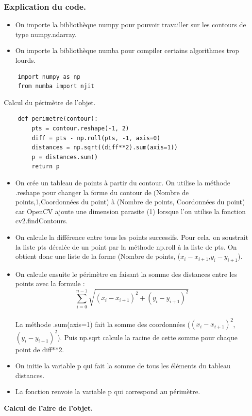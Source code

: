 \documentclass[titlepage]{article}
\begin{document}
	\subsubsection{Explication du code.}
	\begin{itemize}
		\item
		On importe la bibliothèque numpy pour pouvoir travailler sur les contours de type numpy.ndarray.
		\item 
		On importe la bibliothèque numba pour compiler certains algorithmes trop lourds.
	\end{itemize}
	\begin{lstlisting}
	import numpy as np
	from numba import njit
	\end{lstlisting}
	\textbf{}{Calcul du périmètre de l'objet.}
	\begin{lstlisting}
	def perimetre(contour):    
		pts = contour.reshape(-1, 2)
		diff = pts - np.roll(pts, -1, axis=0)
		distances = np.sqrt((diff**2).sum(axis=1))
		p = distances.sum()
		return p
	\end{lstlisting}
	\begin{itemize}
	\item On crée un tableau de points à partir du contour. On utilise la méthode .reshape pour changer la forme du contour de (Nombre de points,1,Coordonnées du point) à (Nombre de points, Coordonnées du point) car OpenCV ajoute une dimension parasite (1) lorsque l'on utilise la fonction cv2.findContours.
	\item 
	On calcule la différence entre tous les points successifs. Pour cela, on soustrait la liste pts décalée de un point par la méthode np.roll à la liste de  pts. On obtient donc une liste de la forme (Nombre de points, ($x_{i} - x_{i+1}$,$y_i - y_{i+1}$).
	\item 
	On calcule ensuite le périmètre en faisant la somme des distances entre les points avec la formule : $$\sum\limits_{i=0}^{n-1}\sqrt{(x_i -x_{i+1})^2+(y_i -y_{i+1})^2}$$ \\
	La méthode .sum(axis=1) fait la somme des coordonnées ($(x_{i} - x_{i+1})^2$,$(y_i - y_{i+1})^2$). Puis np.sqrt calcule la racine de cette somme pour chaque point de diff**2.
	\item 
	On initie la variable p qui fait la somme de tous les éléments du tableau distances. 
	\item 
	La fonction renvoie la variable p qui correspond au périmètre.
	
	
	\end{itemize}
	\textbf{Calcul de l'aire de l'objet.}
\end{document}
